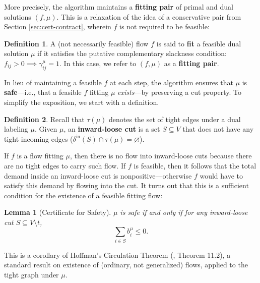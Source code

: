 \documentclass[11pt]{article}
\newtheorem{lemma}[theorem]{Lemma}
\theoremstyle{definition}
\newtheorem{definition}{Definition}[section]
\theoremstyle{definition}
\theoremstyle{definition}
\newcommand{\fu}{f^{\mu}}
\newcommand{\nfiu}{\nabla \fu_i}
\newcommand{\biu}{b_{i}^{\mu}}
\newcommand{\giij}{\gamma_{ij}^{\mu}}
\newcommand{\vnott}{V \setminus t}
\newcommand{\din}{\delta^{\text{in}}}
\newcommand{\dout}{\delta^{\text{out}}}
\DeclareMathOperator{\Def}{Def}
\begin{document}
	More precisely, the algorithm maintains a \textbf{fitting pair}
	of primal and dual solutions $(f,\mu)$. This is a relaxation of the idea of
	a conservative pair from Section \ref{sec:cert-contract}, wherein $f$ is not required
    to be feasible:
	\begin{definition}
	A (not necessarily feasible) flow $f$ is said to \textbf{fit} a feasible dual solution $\mu$
    if it satisfies the putative complementary slackness condition: $f_{ij} > 0 \implies \giij = 1$.
    In this case, we refer to $(f, \mu)$ as a \textbf{fitting pair}.
	\end{definition}
    
	In lieu of maintaining a feasible $f$ at each step,
	the algorithm ensures that $\mu$ is \textbf{safe}---i.e.,
    that a feasible $f$ fitting $\mu$ \emph{exists}---by preserving a
		cut property. To simplify the exposition, we start with a definition.
	\begin{definition}
		Recall that $\tau(\mu)$ denotes the set of tight edges under a dual labeling $\mu$.
		Given $\mu$, an \textbf{inward-loose cut} is a set $S \subseteq V$ that does
		not have any tight incoming edges 
		($\din(S) \cap \tau(\mu) = \varnothing$).
	\end{definition}
	If $f$ is a flow fitting $\mu$, then there is no flow into inward-loose cuts because
	there are no tight edges to carry such flow.
	If $f$ is feasible, then it follows that the total demand inside an inward-loose
	cut is nonpositive---otherwise $f$ would have to satisfy this demand by flowing
	into the cut.
	It turns out that this is a sufficient condition for the existence
	of a feasible fitting flow:
	\begin{lemma}[Certificate for Safety] \label{lem.safety}
	$\mu$ is safe if and only if for any inward-loose cut $S \subseteq \vnott$,
	\[ \sum_{i \in S} \biu \leq 0. \]
	\end{lemma}
	This is a corollary of Hoffman's Circulation Theorem (\cite{Schrijver2002}, Theorem 11.2),
    a standard result on existence
    of (ordinary, not generalized) flows, applied to the tight graph under $\mu$.
\end{document}
